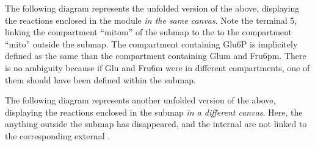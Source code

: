 The following diagram represents the unfolded version of the above, displaying the reactions enclosed in the module \emph{in the same canvas}. Note the terminal 5, linking the compartment ``mitom'' of the submap to the to the compartment ``mito'' outside the submap. The compartment containing Glu6P is implicitely defined as the same than the compartment containing Glum and Fru6pm. There is no ambiguity because if Glu and Fru6m were in different compartments, one of them should have been defined within the submap.

\begin{center}
\end{center}

The following diagram represents another unfolded version of the above, displaying the reactions enclosed in the submap \emph{in a different canvas}. Here, the anything outside the submap has disappeared, and the internal  are not linked to the corresponding external .

\begin{center}
\end{center}
\normalcolor

